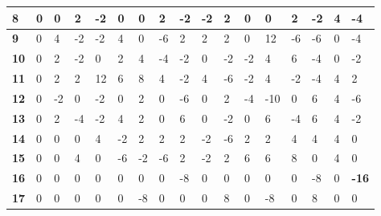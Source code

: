 \begin{longtable}[c]{|l|l|l|l|l|l|l|l|l|l|l|l|l|l|l|l|l|}
\textbf{8}  & 0          & 0          & 2          & -2         & 0          & 0          & 2          & -2         & -2         & 2          & 0           & 0           & 2           & -2          & 4           & -4          \\ \hline
\textbf{9}  & 0          & 4          & -2         & -2         & 4          & 0          & -6         & 2          & 2          & 2          & 0           & 12          & -6          & -6          & 0           & -4          \\ \hline
\textbf{10} & 0          & 2          & -2         & 0          & 2          & 4          & -4         & -2         & 0          & -2         & -2          & 4           & 6           & -4          & 0           & -2          \\ \hline
\textbf{11} & 0          & 2          & 2          & 12         & 6          & 8          & 4          & -2         & 4          & -6         & -2          & 4           & -2          & -4          & 4           & 2           \\ \hline
\textbf{12} & 0          & -2         & 0          & -2         & 0          & 2          & 0          & -6         & 0          & 2          & -4          & -10         & 0           & 6           & 4           & -6          \\ \hline
\textbf{13} & 0          & 2          & -4         & -2         & 4          & 2          & 0          & 6          & 0          & -2         & 0           & 6           & -4          & 6           & 4           & -2          \\ \hline
\textbf{14} & 0          & 0          & 0          & 4          & -2         & 2          & 2          & 2          & -2         & -6         & 2           & 2           & 4           & 4           & 4           & 0           \\ \hline
\textbf{15} & 0          & 0          & 4          & 0          & -6         & -2         & -6         & 2          & -2         & 2          & 6           & 6           & 8           & 0           & 4           & 0           \\ \hline
\textbf{16} & 0          & 0          & 0          & 0          & 0          & 0          & 0          & -8         & 0          & 0          & 0           & 0           & 0           & -8          & 0           & \textbf{-16}         \\ \hline
\textbf{17} & 0          & 0          & 0          & 0          & 0          & -8         & 0          & 0          & 0          & 8          & 0           & -8          & 0           & 8           & 0           & 0           \\ \hline

\end{longtable}
